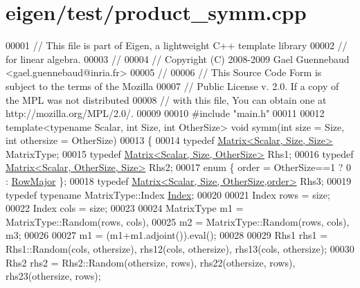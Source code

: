 \hypertarget{eigen_2test_2product__symm_8cpp_source}{}\section{eigen/test/product\+\_\+symm.cpp}
\label{eigen_2test_2product__symm_8cpp_source}

\begin{DoxyCode}
00001 \textcolor{comment}{// This file is part of Eigen, a lightweight C++ template library}
00002 \textcolor{comment}{// for linear algebra.}
00003 \textcolor{comment}{//}
00004 \textcolor{comment}{// Copyright (C) 2008-2009 Gael Guennebaud <gael.guennebaud@inria.fr>}
00005 \textcolor{comment}{//}
00006 \textcolor{comment}{// This Source Code Form is subject to the terms of the Mozilla}
00007 \textcolor{comment}{// Public License v. 2.0. If a copy of the MPL was not distributed}
00008 \textcolor{comment}{// with this file, You can obtain one at http://mozilla.org/MPL/2.0/.}
00009 
00010 \textcolor{preprocessor}{#include "main.h"}
00011 
00012 \textcolor{keyword}{template}<\textcolor{keyword}{typename} Scalar, \textcolor{keywordtype}{int} Size, \textcolor{keywordtype}{int} OtherSize> \textcolor{keywordtype}{void} symm(\textcolor{keywordtype}{int} size = Size, \textcolor{keywordtype}{int} othersize = OtherSize)
00013 \{
00014   \textcolor{keyword}{typedef} \hyperlink{group___core___module_class_eigen_1_1_matrix}{Matrix<Scalar, Size, Size>} MatrixType;
00015   \textcolor{keyword}{typedef} \hyperlink{group___core___module_class_eigen_1_1_matrix}{Matrix<Scalar, Size, OtherSize>} Rhs1;
00016   \textcolor{keyword}{typedef} \hyperlink{group___core___module_class_eigen_1_1_matrix}{Matrix<Scalar, OtherSize, Size>} Rhs2;
00017   \textcolor{keyword}{enum} \{ order = OtherSize==1 ? 0 : \hyperlink{group__enums_ggaacded1a18ae58b0f554751f6cdf9eb13acfcde9cd8677c5f7caf6bd603666aae3}{RowMajor} \};
00018   \textcolor{keyword}{typedef} \hyperlink{group___core___module_class_eigen_1_1_matrix}{Matrix<Scalar, Size, OtherSize,order>} Rhs3;
00019   \textcolor{keyword}{typedef} \textcolor{keyword}{typename} MatrixType::Index \hyperlink{namespace_eigen_a62e77e0933482dafde8fe197d9a2cfde}{Index};
00020 
00021   Index rows = size;
00022   Index cols = size;
00023 
00024   MatrixType m1 = MatrixType::Random(rows, cols),
00025              m2 = MatrixType::Random(rows, cols), m3;
00026 
00027   m1 = (m1+m1.adjoint()).eval();
00028 
00029   Rhs1 rhs1 = Rhs1::Random(cols, othersize), rhs12(cols, othersize), rhs13(cols, othersize);
00030   Rhs2 rhs2 = Rhs2::Random(othersize, rows), rhs22(othersize, rows), rhs23(othersize, rows);

\end{DoxyCode}
